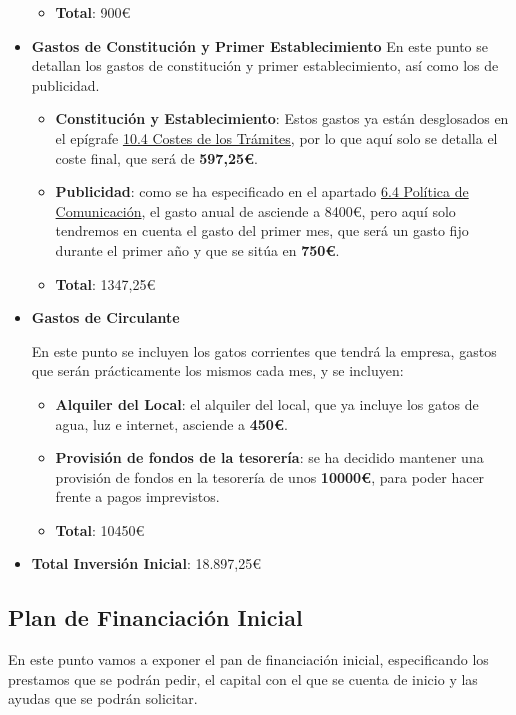 \begin{itemize}
\begin{itemize}
          \item \textbf{Total}: 900€
    \end{itemize}

    \item \textbf{Gastos de Constitución y Primer Establecimiento}
    En este punto se detallan los gastos de constitución y primer establecimiento, así como los de publicidad.
    \begin{itemize}
        \item \textbf{Constitución y Establecimiento}: Estos gastos ya están desglosados en el epígrafe \hyperref[sec:costetramites]{10.4 Costes de los Trámites}, por lo que aquí solo se detalla el coste final, que será de \textbf{597,25€}.

        \item \textbf{Publicidad}: como se ha especificado en el apartado \hyperref[sec:publi]{6.4 Política de Comunicación}, el gasto anual de asciende a 8400€, pero aquí solo tendremos en cuenta el gasto del primer mes, que será un gasto fijo durante el primer año y que se sitúa en \textbf{750€}.

        \item \textbf{Total}: 1347,25€
    \end{itemize}


    \item \textbf{Gastos de Circulante}

    En este punto se incluyen los gatos corrientes que tendrá la empresa, gastos que serán prácticamente los
    mismos cada mes, y se incluyen:

    \begin{itemize}
        \item \textbf{Alquiler del Local}: el alquiler del local, que ya incluye los gatos de agua, luz e internet, asciende a \textbf{450€}.
        \item \textbf{Provisión de fondos de la tesorería}: se ha decidido mantener una provisión de fondos en la tesorería de unos \textbf{10000€}, para poder hacer frente a pagos imprevistos.

        \item \textbf{Total}: 10450€
    \end{itemize}

    \item \textbf{Total Inversión Inicial}: 18.897,25€
\end{itemize}

\subsection{Plan de Financiación Inicial}
En este punto vamos a exponer el pan de financiación inicial, especificando los prestamos que se podrán pedir,
el capital con el que se cuenta de inicio y las ayudas que se podrán solicitar.


